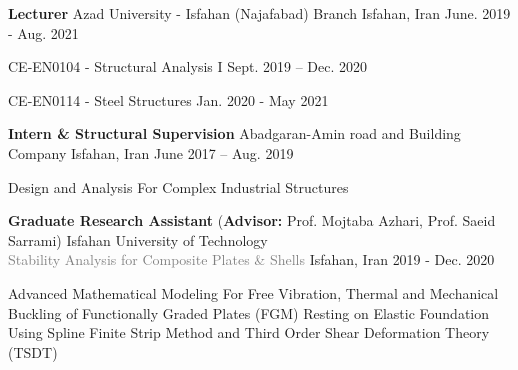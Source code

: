 

\begin{cventries}
\vspace{5pt}


\cventry 
    {\textbf{Lecturer} } %
    {Azad University - Isfahan (Najafabad) Branch} %
    {Isfahan, Iran} %
    {June. 2019 - Aug. 2021} %
    {
    \begin{cvitems} %
		\item {CE-EN0104 - Structural Analysis I	\hfill			Sept. 2019 – Dec. 2020 }
		\item {CE-EN0114 - Steel Structures	\hfill			Jan. 2020 - May 2021}
	\end{cvitems}   
     }

      \vspace{10pt}
  \cventry
    {\textbf{Intern \& Structural Supervision }} %
    {Abadgaran-Amin road and Building Company} %
    {Isfahan, Iran} %
    {June 2017 – Aug. 2019} %
    { 
            \begin{cvitems} %
	        \item {Design and Analysis For Complex Industrial Structures \hfill		}
	      \end{cvitems}
	      }
\end{cventries}
\vspace{10pt} 
     
\cventry
{\textbf{Graduate Research Assistant} \hspace{4pt} (\textbf{Advisor:} Prof. Mojtaba Azhari, Prof. Saeid Sarrami)} %
{Isfahan University of Technology\\ \textcolor{gray}{Stability Analysis for Composite Plates \& Shells} } %
{Isfahan, Iran} %
{2019 - Dec. 2020 } %
        { 
	      \begin{cvitems} %
	        \item {Advanced Mathematical Modeling For Free Vibration, Thermal and Mechanical Buckling of Functionally Graded Plates (FGM) Resting on Elastic Foundation Using Spline Finite Strip Method and Third Order Shear Deformation Theory (TSDT) \hfill		}
	      \end{cvitems}
	      }
  \vspace{10pt}





